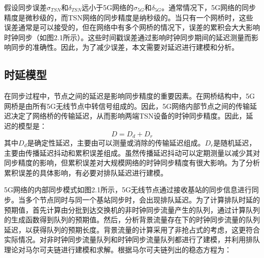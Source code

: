 \documentclass[UTF8,a4paper,12pt]{ctexart}
\numberwithin{equation}{section}
\begin{document}
假设同步误差$\sigma_{TSN}$和$\delta_{TSN}$远小于5G网络的$\sigma_{5G}$和$\delta_{5G}$。通常情况下，5G网络的同步精度是微秒级的，而TSN网络的同步精度是纳秒级的。当只有一个网桥时，这些误差通常是可以接受的，但在网络中有多个网桥的情况下，误差的累积会大大影响时钟同步（如图2.1所示）。这些时间戳误差通过影响时钟同步期间的延迟测量而影响同步的准确性。因此，为了减少误差，本文需要对延迟进行建模和分析。
\subsection{时延模型}
在同步过程中，节点之间的延迟是影响同步精度的重要因素。在网桥结构中，5G网桥是由所有5G无线节点中转信号组成的。因此，5G网络内部节点之间的传输延迟决定了网络桥的传输延迟，从而影响两端TSN设备的时钟同步精度。因此，延迟的模型是：
\begin{equation}
	D=D_d+D_r
\end{equation}
其中$D_d$是确定性延迟，主要由可以测量或消除的传输延迟组成。$D_r$是随机延迟，主要由传播延迟抖动和累积误差组成。虽然传播延迟抖动可以定期测量以减少其对同步精度的影响，但累积误差对大规模网络的时钟同步精度有很大影响。为了分析累积误差的具体影响，有必要对排队延迟进行建模。
\begin{figure}[htb] 
\end{figure}
5G网络的内部同步模式如图2.1所示，5G无线节点通过接收基站的同步信息进行同步。当多个节点同时与同一个基站同步时，会出现排队延迟。为了计算排队时延的预期值，首先计算由分批到达交换机的非时钟同步流量产生的队列，通过计算队列的生成函数得到队列的预期值。然后，分析背景流量存在下的时钟同步流量的队列延迟，以获得队列的预期长度。背景流量的计算采用了非抢占式的考虑，这更符合实际情况。对非时钟同步流量队列和时钟同步流量队列都进行了建模，并利用排队理论对马尔可夫链进行建模和求解。根据马尔可夫链列出的稳态方程为：
\end{document}
